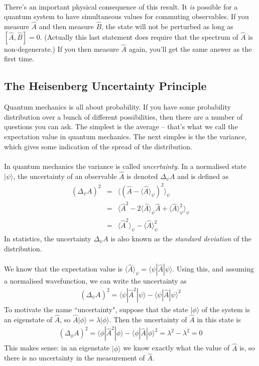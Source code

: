 \documentclass[12pt]{article}
\def\be{\begin{eqnarray}}
\def\ee{\end{eqnarray}}
\newcommand{\nn}{\nonumber}
\newcommand\para{\paragraph{}}
\newcommand{\ket}[1]{|#1\rangle}
\newcommand{\bra}[1]{\langle#1|}
\newcommand{\co}{\color{olive}}
\begin{document}
{\para
There's an important physical consequence of this result. {\co It {\it is} possible for  a quantum system to have simultaneous values for commuting observables. If you measure $\hat{A}$ and then measure $\hat{B}$, the state will not be perturbed as long as $[\hat{A},\hat{B}]=0$.} (Actually this last statement does require that the spectrum of $\hat{A}$ is non-degenerate.) If you then measure $\hat{A}$ again, you'll get the same answer as the first time.  







\subsection{The Heisenberg Uncertainty Principle}

Quantum mechanics is all about probability. If you have some probability distribution  over a bunch of different possibilities, then there are a number of questions you can ask. The simplest is the average -- that's what we call the expectation value in quantum mechanics.  The next simples is the 
 the variance, which gives some indication of the spread of the distribution.

\para
{\co In quantum mechanics the variance  is called {\it uncertainty}. In a normalised state $\ket{\psi}$, the uncertainty of an observable $\hat{A}$ is denoted $\Delta_\psi {A}$ and is defined as
%
\be (\Delta_\psi{A})^2 &=& \langle (\hat{A}-\langle\hat{A}\rangle_\psi)^2\rangle_\psi
\nn\\ &=& \langle \hat{A}^2- 2\langle\hat{A}\rangle_\psi\hat{A} + \langle\hat{A}\rangle_\psi^2 \rangle_\psi  
\nn\\ &=&\langle\hat{A}^2\rangle_\psi - \langle \hat{A}\rangle_\psi^2\nn\ee
%
}
In statistics, the uncertainty $\Delta_\psi A$ is also  known as the {\it standard deviation} of the distribution. 

\para
{\co We know that the expectation value is $\langle \hat{A}\rangle_\psi = \bra{\psi}\hat{A}\ket{\psi}$. Using this, and assuming a normalised wavefunction, we can write the uncertainty as
%
\be (\Delta_\psi{A})^2 = \bra{\psi}\hat{A}^2\ket{\psi} - \bra{\psi}\hat{A}\ket{\psi}^2\nn\ee
%
To motivate the name ``uncertainty", suppose that the state $\ket{\phi}$ of the system is an eigenstate of $\hat{A}$, so  $\hat{A}\ket{\phi} = \lambda\ket{\phi}$. 
Then the uncertainty of $\hat{A}$ in this state is
%
\be (\Delta_\phi{A})^2 = \bra{\phi}\hat{A}^2\ket{\phi} - \bra{\phi}\hat{A}\ket{\phi}^2 = \lambda^2 -\lambda^2 = 0\nn\ee
%
}
This makes sense: in an eigenstate $\ket{\phi}$ we know exactly what the value of $\hat{A}$ is, so there is no uncertainty in the measurement of $\hat{A}$. 

}
\end{document}
